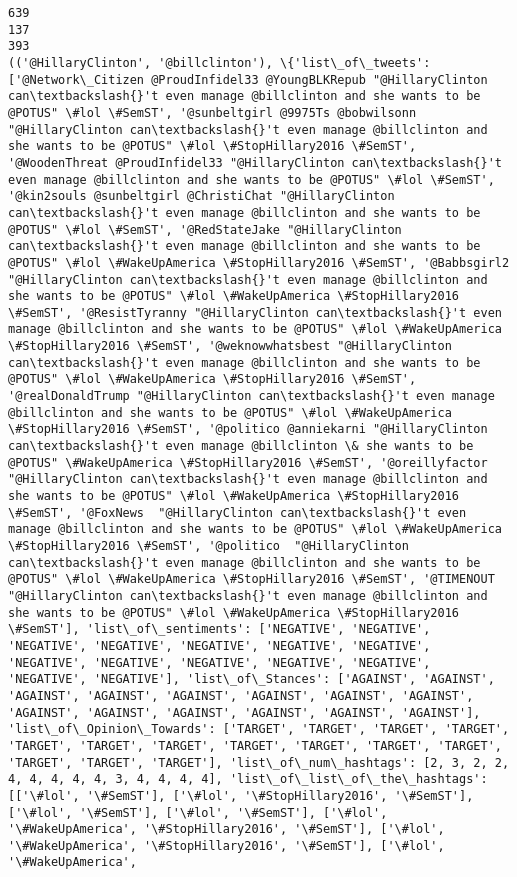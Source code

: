 \documentclass[11pt]{article}
\begin{document}
    \begin{Verbatim}[commandchars=\\\{\}]
639
137
393
(('@HillaryClinton', '@billclinton'), \{'list\_of\_tweets': ['@Network\_Citizen @ProudInfidel33 @YoungBLKRepub "@HillaryClinton can\textbackslash{}'t even manage @billclinton and she wants to be @POTUS" \#lol \#SemST', '@sunbeltgirl @9975Ts @bobwilsonn "@HillaryClinton can\textbackslash{}'t even manage @billclinton and she wants to be @POTUS" \#lol \#StopHillary2016 \#SemST', '@WoodenThreat @ProudInfidel33 "@HillaryClinton can\textbackslash{}'t even manage @billclinton and she wants to be @POTUS" \#lol \#SemST', '@kin2souls @sunbeltgirl @ChristiChat "@HillaryClinton can\textbackslash{}'t even manage @billclinton and she wants to be @POTUS" \#lol \#SemST', '@RedStateJake "@HillaryClinton can\textbackslash{}'t even manage @billclinton and she wants to be @POTUS" \#lol \#WakeUpAmerica \#StopHillary2016 \#SemST', '@Babbsgirl2 "@HillaryClinton can\textbackslash{}'t even manage @billclinton and she wants to be @POTUS" \#lol \#WakeUpAmerica \#StopHillary2016 \#SemST', '@ResistTyranny "@HillaryClinton can\textbackslash{}'t even manage @billclinton and she wants to be @POTUS" \#lol \#WakeUpAmerica \#StopHillary2016 \#SemST', '@weknowwhatsbest "@HillaryClinton can\textbackslash{}'t even manage @billclinton and she wants to be @POTUS" \#lol \#WakeUpAmerica \#StopHillary2016 \#SemST', '@realDonaldTrump "@HillaryClinton can\textbackslash{}'t even manage @billclinton and she wants to be @POTUS" \#lol \#WakeUpAmerica \#StopHillary2016 \#SemST', '@politico @anniekarni "@HillaryClinton can\textbackslash{}'t even manage @billclinton \& she wants to be @POTUS" \#WakeUpAmerica \#StopHillary2016 \#SemST', '@oreillyfactor "@HillaryClinton can\textbackslash{}'t even manage @billclinton and she wants to be @POTUS" \#lol \#WakeUpAmerica \#StopHillary2016 \#SemST', '@FoxNews  "@HillaryClinton can\textbackslash{}'t even manage @billclinton and she wants to be @POTUS" \#lol \#WakeUpAmerica \#StopHillary2016 \#SemST', '@politico  "@HillaryClinton can\textbackslash{}'t even manage @billclinton and she wants to be @POTUS" \#lol \#WakeUpAmerica \#StopHillary2016 \#SemST', '@TIMENOUT  "@HillaryClinton can\textbackslash{}'t even manage @billclinton and she wants to be @POTUS" \#lol \#WakeUpAmerica \#StopHillary2016 \#SemST'], 'list\_of\_sentiments': ['NEGATIVE', 'NEGATIVE', 'NEGATIVE', 'NEGATIVE', 'NEGATIVE', 'NEGATIVE', 'NEGATIVE', 'NEGATIVE', 'NEGATIVE', 'NEGATIVE', 'NEGATIVE', 'NEGATIVE', 'NEGATIVE', 'NEGATIVE'], 'list\_of\_Stances': ['AGAINST', 'AGAINST', 'AGAINST', 'AGAINST', 'AGAINST', 'AGAINST', 'AGAINST', 'AGAINST', 'AGAINST', 'AGAINST', 'AGAINST', 'AGAINST', 'AGAINST', 'AGAINST'], 'list\_of\_Opinion\_Towards': ['TARGET', 'TARGET', 'TARGET', 'TARGET', 'TARGET', 'TARGET', 'TARGET', 'TARGET', 'TARGET', 'TARGET', 'TARGET', 'TARGET', 'TARGET', 'TARGET'], 'list\_of\_num\_hashtags': [2, 3, 2, 2, 4, 4, 4, 4, 4, 3, 4, 4, 4, 4], 'list\_of\_list\_of\_the\_hashtags': [['\#lol', '\#SemST'], ['\#lol', '\#StopHillary2016', '\#SemST'], ['\#lol', '\#SemST'], ['\#lol', '\#SemST'], ['\#lol', '\#WakeUpAmerica', '\#StopHillary2016', '\#SemST'], ['\#lol', '\#WakeUpAmerica', '\#StopHillary2016', '\#SemST'], ['\#lol', '\#WakeUpAmerica', 
\end{Verbatim}
\end{document}
